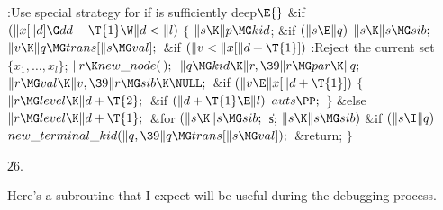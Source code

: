 \Y\B\4:Use special strategy for  if  is sufficiently
deep\X${}\E{}$\6
\&{if} ${}(\|x[\|d]\G\\{dd}-\T{1}\W\|d<\|l){}$\5
${}\{{}$\1\6
${}\|s\K\|p\MG\\{kid}{}$;\5
\&{if} ${}(\|s\E\|q){}$\1\5
${}\|s\K\|s\MG\\{sib};{}$\2\6
${}\|v\K\|q\MG\\{trans}[\|s\MG\\{val}];{}$\6
\&{if} ${}(\|v<\|x[\|d+\T{1}]){}$\1\5
:Reject the current set $\{x_1,\ldots,x_l\}$\X;\2\6
${}\|r\K\\{new\_node}(\,);{}$\6
${}\|q\MG\\{kid}\K\|r,\39\|r\MG\\{par}\K\|q;{}$\6
${}\|r\MG\\{val}\K\|v,\39\|r\MG\\{sib}\K\NULL;{}$\6
\&{if} ${}(\|v\E\|x[\|d+\T{1}]){}$\5
${}\{{}$\1\6
${}\|r\MG\\{level}\K\|d+\T{2};{}$\6
\&{if} ${}(\|d+\T{1}\E\|l){}$\1\5
${}\\{auts}\PP;{}$\2\6
\4${}\}{}$\5
\2\&{else}\1\5
${}\|r\MG\\{level}\K\|d+\T{1};{}$\2\6
\&{for} ${}(\|s\K\|s\MG\\{sib};{}$ \|s; ${}\|s\K\|s\MG\\{sib}){}$\1\6
\&{if} ${}(\|s\I\|q){}$\1\5
${}\\{new\_terminal\_kid}(\|q,\39\|q\MG\\{trans}[\|s\MG\\{val}]);{}$\2\2\6
\&{return};\6
\4${}\}{}$\2\par
\U26.\fi

Here's a subroutine that I expect will be useful during
the debugging
process.

